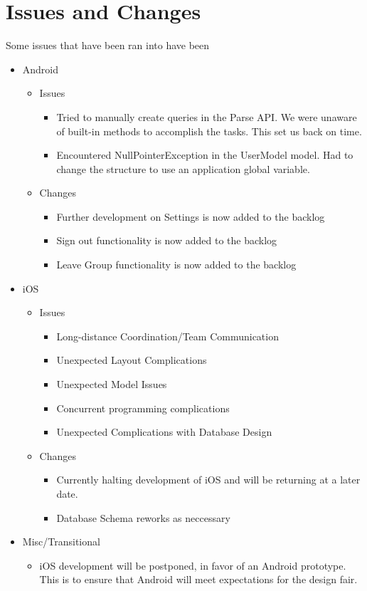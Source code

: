 \documentclass[11pt]{article}
\begin{document}
\section*{Issues and Changes}
Some issues that have been ran into have been

	\begin{itemize}
		\item Android
			\begin{itemize}
				\item Issues
				\begin{itemize}
					\item Tried to manually create queries in the Parse API. We were unaware of built-in methods to accomplish the tasks. This set us back on time.
					\item Encountered NullPointerException in the UserModel model. Had to change the structure to use an application global variable.					
				\end{itemize}
				
				\item Changes
				\begin{itemize}
					\item Further development on Settings is now added to the backlog
					\item Sign out functionality is now added to the backlog
					\item Leave Group functionality is now added to the backlog			
				\end{itemize}
			\end{itemize}
		\item iOS
			\begin{itemize}
			\item Issues
				\begin{itemize}
				\item Long-distance Coordination/Team Communication
				\item Unexpected Layout Complications
				\item Unexpected Model Issues
				\item Concurrent programming complications
				\item Unexpected Complications with Database Design
				\end{itemize}
			\item Changes
				\begin{itemize}
				\item Currently halting development of iOS and will be returning at a later date.
				\item Database Schema reworks as neccessary
				\end{itemize}
			\end{itemize}
		\item Misc/Transitional
		\begin{itemize}
			\item iOS development will be postponed, in favor of an Android prototype. This is to ensure that Android will meet expectations for the design fair.
		\end{itemize}
	\end{itemize}
\end{document}
